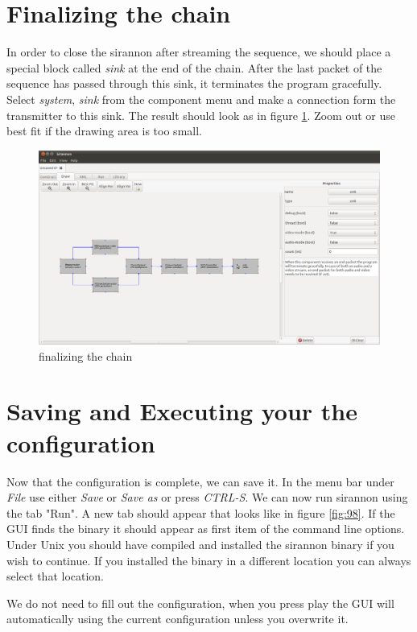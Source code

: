 \documentclass[12pt]{report}
\begin{document}
\section{Finalizing the chain}
In order to close the sirannon after streaming the sequence, we should place a special block called \textit{sink} at the end of the chain. After the last packet of the sequence has passed through this sink, it terminates the program gracefully. Select \textit{system}, \textit{sink} from the component menu and make a connection form the transmitter to this sink. The result should look as in figure \ref{fig:14}. Zoom out or use best fit if the drawing area is too small.
\begin{center}
\begin{figure}[!ht]
	\includegraphics[width=1.0\textwidth]{./images/ui09.png}
	\caption{finalizing the chain}
	\label{fig:14}
\end{figure}
\end{center}
\newpage

\section{Saving and Executing your the configuration}
Now that the configuration is complete, we can save it. In the menu bar under \textit{File} use either \textit{Save} or \textit{Save as} or press \textit{CTRL-S}. We can now run sirannon using the tab "Run". A new tab should appear that looks like in figure \ref{fig:98}.
If the GUI finds the binary it should appear as first item of the command line options. Under Unix you should have compiled and installed the sirannon binary if you wish to continue. If you installed the binary in a different location you can always select that location.

We do not need to fill out the configuration, when you press play the GUI will automatically using the current configuration unless you overwrite it.
\end{document}
